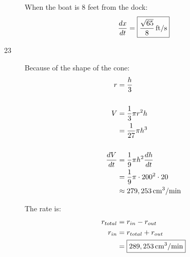 \documentclass[letterpaper, landscape]{exam}
\begin{document}
\begin{description}
      When the boat is 8 feet from the dock:
      \[
        \frac{dx}{dt} = \boxed{ \unit[\frac{\sqrt{65}}{8}]{ft/s} }
      \]

    \item[23]
      Because of the shape of the cone:
      \begin{align*}
        r             & = \frac{h}{3} \\
        \\
        V             & = \frac{1}{3} \pi r^2 h \\
                      & = \frac{1}{27} \pi h^3 \\
        \\
        \frac{dV}{dt} & = \frac{1}{9} \pi h^2 \frac{dh}{dt} \\
                      & = \frac{1}{9} \pi \cdot 200^2 \cdot 20 \\
                      & \approx \unit[279,253]{cm^3/min}
      \end{align*}

      The rate is:
      \begin{align*}
        r_{total} & = r_{in} - r_{out} \\
        r_{in}    & = r_{total} + r_{out} \\
                  & = \boxed{ \unit[289,253]{cm^3/min} } \\
      \end{align*}
  \end{description}
\end{document}
